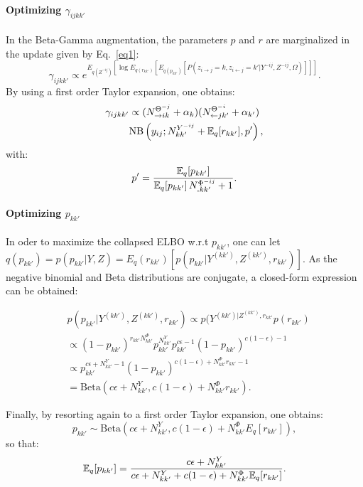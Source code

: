 \paragraph{Optimizing $\gamma_{ijkk'}$}

In the Beta-Gamma augmentation, the parameters $p$ and $r$ are marginalized in the update given by Eq.~\eqref{eq1}:
%
\begin{equation}
\gamma_{ijkk'} \propto e^{E_{q(Z^{-ij})} [\log E_{q(r_{kk'})}[E_{q(p_{kk'})}[ P(z_{i\rightarrow j}=k, z_{i\leftarrow j}=k' | Y^{-ij}, Z^{-ij}, \Omega) ] ] ]}. \nonumber
\end{equation}
%
By using a first order Taylor expansion, one obtains:
%
\begin{align*}
\gamma_{ijkk'} & \propto (N_{\rightarrow ik}^{\Theta^{-j}} + \alpha_k) (N_{\leftarrow jk'}^{\Theta^{-i}} + \alpha_{k'}) \\
& \mathrm{NB}\left(y_{ij}; N^{Y^{-ij}}_{kk'} + \mathbb{E}_{q}[r_{kk'}], p' \right),
\end{align*}
%
with:
%
\[
p' = \frac{\mathbb{E}_{q}[p_{kk'}]}{\mathbb{E}_{q}[p_{kk'}]\,N^{\Phi^{-ij}}_{\bm{.}kk'} + 1}.
\]

\paragraph{Optimizing $p_{kk'}$}

In oder to maximize the collapsed ELBO w.r.t $p_{kk'}$, one can let $q(p_{kk'}) = p(p_{kk'} | Y,Z) = E_q(r_{kk'}) [ p(p_{kk'} | Y^{(kk')},Z^{(kk')} ,r_{kk'})]$. As the negative binomial and Beta distributions are conjugate, a closed-form expression can be obtained:

\begin{align*}
& p(p_{kk'} | Y^{(kk')}, Z^{(kk')}, r_{kk'}) \propto p(Y^{(kk')| Z^{(kk')}, r_{kk'}} p(r_{kk'}) \\
& \propto (1-p_{kk'})^{r_{kk'} N^\Phi_{kk'}}p_{kk'}^{N^Y_{kk'}} p_{kk'}^{c\epsilon -1} (1-p_{kk'})^{c(1-\epsilon) -1} \\
& \propto p_{kk'}^{c\epsilon + N^Y_{kk'} -1} (1-p_{kk'})^{c(1-\epsilon) + N^\Phi_{kk'}r_{kk'}-1} \\
& = \mathrm{Beta}(c\epsilon + N^Y_{kk'}, c(1-\epsilon) + N^\Phi_{kk'}r_{kk'}).
\end{align*}

Finally, by resorting again to a first order Taylor expansion, one obtains:
%
\begin{equation*}
p_{kk'} \sim \mathrm{Beta}(c\epsilon + N^Y_{kk'}, c(1-\epsilon) + N^\Phi_{kk'} E_q[r_{kk'}]), \nonumber
\end{equation*}
%
so that:
%
\[
\mathbb{E}_{q}[p_{kk'}] = \frac{c\epsilon + N^Y_{kk'}}{c\epsilon + N^Y_{kk'} + c(1-\epsilon) + N^\Phi_{kk'}\mathbb{E}_{q}[r_{kk'}]}.
\]
%

